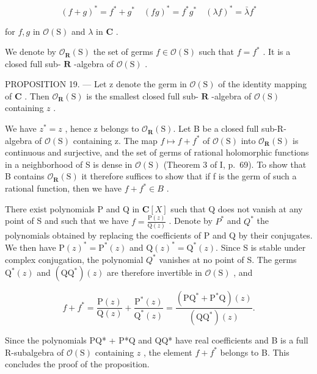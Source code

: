 \[
(f + g) ^ {*} = f ^ {*} + g ^ {*} \quad (f g) ^ {*} = f ^ {*} g ^ {*} \quad (\lambda f) ^ {*} = \bar {\lambda} f ^ {*}
\]

for \(f,g\) in \(\mathcal{O}(\mathrm{S})\) and \(\lambda\) in \(\mathbf{C}\) .

We denote by \(\mathcal{O}_{\mathbf{R}}(\mathrm{S})\) the set of germs \(f \in \mathcal{O}(\mathrm{S})\) such that \(f = f^{*}\) . It is a closed full sub- \(\mathbf{R}\) -algebra of \(\mathcal{O}(\mathrm{S})\) .

PROPOSITION 19. --- Let z denote the germ in \(\mathcal{O}(\mathrm{S})\) of the identity mapping of \(\mathbf{C}\) . Then \(\mathcal{O}_{\mathbf{R}}(\mathrm{S})\) is the smallest closed full sub- \(\mathbf{R}\) -algebra of \(\mathcal{O}(\mathrm{S})\) containing \(z\) .

We have \(z^{*} = z\) , hence z belongs to \(\mathcal{O}_{\mathbf{R}}(\mathrm{S})\). Let B be a closed full sub-R-algebra of \(\mathcal{O}(\mathrm{S})\) containing z. The map \(f \mapsto f + f^{*}\) of \(\mathcal{O}(\mathrm{S})\) into \(\mathcal{O}_{\mathbf{R}}(\mathrm{S})\) is continuous and surjective, and the set of germs of rational holomorphic functions in a neighborhood of S is dense in \(\mathcal{O}(\mathrm{S})\) (Theorem 3 of I, p.~69). To show that B contains \(\mathcal{O}_{\mathbf{R}}(\mathrm{S})\) it therefore suffices to show that if f is the germ of such a rational function, then we have \(f + f^{*} \in B\) .

There exist polynomials P and Q in \(\mathbf{C}[X]\) such that Q does not vanish at any point of S and such that we have \(f = \frac{\mathrm{P}(z)}{\mathrm{Q}(z)}\) . Denote by \(P^{*}\) and \(Q^{*}\) the polynomials obtained by replacing the coefficients of P and Q by their conjugates. We then have \(\mathrm{P}(z)^{*} = \mathrm{P}^{*}(z)\) and \(\mathrm{Q}(z)^{*} = \mathrm{Q}^{*}(z)\). Since S is stable under complex conjugation, the polynomial \(Q^{*}\) vanishes at no point of S. The germs \(\mathrm{Q}^{*}(z)\) and \((\mathrm{QQ}^{*})(z)\) are therefore invertible in \(\mathcal{O}(\mathrm{S})\) , and

\[
f + f ^ {*} = \frac {\mathrm{P} (z)}{\mathrm{Q} (z)} + \frac {\mathrm{P} ^ {*} (z)}{\mathrm{Q} ^ {*} (z)} = \frac {(\mathrm{PQ} ^ {*} + \mathrm{P} ^ {*} \mathrm{Q}) (z)}{(\mathrm{QQ} ^ {*}) (z)}.
\]

Since the polynomials PQ* + P*Q and QQ* have real coefficients and B is a full R-subalgebra of \(\mathcal{O}(\mathrm{S})\) containing \(z\) , the element \(f + f^{*}\) belongs to B. This concludes the proof of the proposition.

